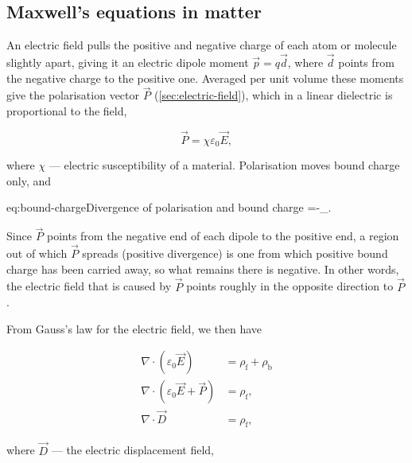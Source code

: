     \subsection{Maxwell's equations in matter}
    \label{sec:maxwell-matter}

        An electric field pulls the positive and negative charge of each atom or molecule slightly apart, giving it an electric dipole moment $\vec{p} = q\vec{d}$, where $\vec{d}$ points from the negative charge to the positive one. Averaged per unit volume these moments give the polarisation vector $\vec{P}$ (\cref{sec:electric-field}), which in a linear dielectric is proportional to the field,

        \begin{equation}\label{eq:polarisation-vector}
            \vec{P}=\chi \varepsilon_0\vec{E},
        \end{equation}

        where $\chi$ --- electric susceptibility of a material. Polarisation moves bound charge only, and

        \begin{keyeq}{eq:bound-charge}{Divergence of polarisation and bound charge}
            \nabla\cdot{}=-\rho_{}.
        \end{keyeq}

        Since $\vec{P}$ points from the negative end of each dipole to the positive end, a region out of which $\vec{P}$ spreads (positive divergence) is one from which positive bound charge has been carried away, so what remains there is negative. In other words, the electric field that is caused by $\vec{P}$ points roughly in the opposite direction to $\vec{P}$.

        From Gauss's law for the electric field, we then have

        \begin{equation*}
            \begin{aligned}
                \nabla\cdot(\varepsilon_0\vec{E})          &= \rho_{\text{f}} + \rho_{\text{b}} \\
                \nabla\cdot(\varepsilon_0\vec{E}+\vec{P})  &= \rho_{\text{f}}, \\
                \nabla\cdot\vec{D} &= \rho_{\text{f}},
            \end{aligned}
        \end{equation*}

        where $\vec{D}$ --- the electric displacement field,


